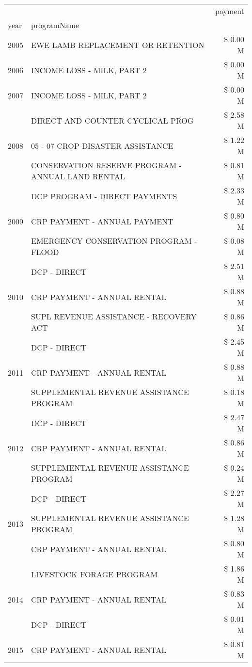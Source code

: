\begin{tabular}{llr}
\toprule
 &  & payment \\
year & programName &  \\
\midrule
2005 & EWE LAMB REPLACEMENT OR RETENTION & \$ 0.00 M \\
\cline{1-3}
2006 & INCOME LOSS - MILK, PART 2 & \$ 0.00 M \\
\cline{1-3}
2007 & INCOME LOSS - MILK, PART 2 & \$ 0.00 M \\
\cline{1-3}
\multirow[t]{3}{*}{2008} & DIRECT AND COUNTER CYCLICAL PROG & \$ 2.58 M \\
 & 05 - 07 CROP DISASTER ASSISTANCE & \$ 1.22 M \\
 & CONSERVATION RESERVE PROGRAM - ANNUAL LAND RENTAL & \$ 0.81 M \\
\cline{1-3}
\multirow[t]{3}{*}{2009} & DCP PROGRAM - DIRECT PAYMENTS & \$ 2.33 M \\
 & CRP PAYMENT - ANNUAL PAYMENT & \$ 0.80 M \\
 & EMERGENCY CONSERVATION PROGRAM - FLOOD & \$ 0.08 M \\
\cline{1-3}
\multirow[t]{3}{*}{2010} & DCP - DIRECT & \$ 2.51 M \\
 & CRP PAYMENT - ANNUAL RENTAL & \$ 0.88 M \\
 & SUPL REVENUE ASSISTANCE - RECOVERY ACT & \$ 0.86 M \\
\cline{1-3}
\multirow[t]{3}{*}{2011} & DCP - DIRECT & \$ 2.45 M \\
 & CRP PAYMENT - ANNUAL RENTAL & \$ 0.88 M \\
 & SUPPLEMENTAL REVENUE ASSISTANCE PROGRAM & \$ 0.18 M \\
\cline{1-3}
\multirow[t]{3}{*}{2012} & DCP - DIRECT & \$ 2.47 M \\
 & CRP PAYMENT - ANNUAL RENTAL & \$ 0.86 M \\
 & SUPPLEMENTAL REVENUE ASSISTANCE PROGRAM & \$ 0.24 M \\
\cline{1-3}
\multirow[t]{3}{*}{2013} & DCP - DIRECT & \$ 2.27 M \\
 & SUPPLEMENTAL REVENUE ASSISTANCE PROGRAM & \$ 1.28 M \\
 & CRP PAYMENT - ANNUAL RENTAL & \$ 0.80 M \\
\cline{1-3}
\multirow[t]{3}{*}{2014} & LIVESTOCK FORAGE PROGRAM & \$ 1.86 M \\
 & CRP PAYMENT - ANNUAL RENTAL & \$ 0.83 M \\
 & DCP - DIRECT & \$ 0.01 M \\
\cline{1-3}
\multirow[t]{3}{*}{2015} & CRP PAYMENT - ANNUAL RENTAL & \$ 0.81 M \\

\end{tabular}

